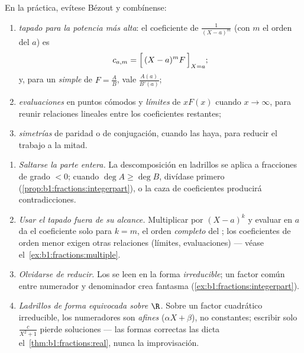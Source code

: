 \begin{method}\label{met:b1:fractions:compute}
En la práctica, evítese Bézout y combínense:
\begin{enumerate}
  \item \emph{tapado para la potencia más alta}: el coeficiente de
        $\frac{1}{(X-a)^m}$ (con $m$ el orden del  $a$) es
        \[
        c_{a,m} = \Bigl[\,(X - a)^m F\,\Bigr]_{X = a};
        \]
        y, para un  \emph{simple} de $F = \frac AB$, vale
        $\frac{A(a)}{B'(a)}$;
  \item \emph{evaluaciones} en puntos cómodos y \emph{límites} de
        $xF(x)$ cuando $x \to \infty$, para reunir relaciones lineales
        entre los coeficientes restantes;
  \item \emph{simetrías} de paridad o de conjugación, cuando las haya,
        para reducir el trabajo a la mitad.
\end{enumerate}
\end{method}

\begin{remark}\label{rem:b1:fractions:pitfalls}
\begin{enumerate}
  \item \emph{Saltarse la parte entera.} La descomposición en
        ladrillos se aplica a fracciones de grado $< 0$; cuando
        $\deg A \geq \deg B$, divídase primero
        (\cref{prop:b1:fractions:integerpart}), o la caza de
        coeficientes producirá contradicciones.
  \item \emph{Usar el tapado fuera de su alcance.} Multiplicar por
        $(X - a)^k$ y evaluar en $a$ da el coeficiente solo para
        $k = m$, el orden \emph{completo} del ; los coeficientes
        de orden menor exigen otras relaciones (límites,
        evaluaciones) --- véase el~\cref{ex:b1:fractions:multiple}.
  \item \emph{Olvidarse de reducir.} Los  se leen en la forma
        \emph{irreducible}; un factor común entre numerador y
        denominador crea  fantasma
        (\cref{ex:b1:fractions:integerpart}).
  \item \emph{Ladrillos de forma equivocada sobre $\R$.} Sobre un
        factor cuadrático irreducible, los numeradores son
        \emph{afines} ($\alpha X + \beta$), no constantes; escribir
        solo $\frac{c}{X^2 + 1}$ pierde soluciones --- las formas
        correctas las dicta el~\cref{thm:b1:fractions:real}, nunca la
        improvisación.
\end{enumerate}
\end{remark}

